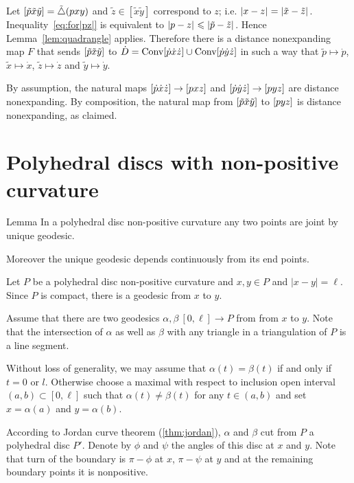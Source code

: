 Let $\trig{\tilde  p}{\tilde  x}{\tilde  y}=\modtrig0 (p x y)$ 
and $\tilde  z\in[\tilde  x\tilde  y]$ correspond to $z$; i.e. $\dist{x}{z}{}=\dist{\tilde  x}{\tilde  z}{}$.
Inequality~\ref{eq:for|pz|} is equivalent to $\dist{ p}{ z}{}\le \dist{\tilde  p}{\tilde  z}{}$.
Hence  Lemma~\ref{lem:quadrangle} applies.  Therefore 
there is a distance nonexpanding map $F$ that  sends 
$\trig{\tilde  p}{\tilde  x}{\tilde  y}$ to $\dot D=\Conv\trig {\dot p}{\dot x}{\dot z}\cup \Conv\trig {\dot p} {\dot y} {\dot z}$ 
in such a way that 
$\tilde p\mapsto \dot p$,
$\tilde x\mapsto \dot x$,
$\tilde z\mapsto \dot z$
and
$\tilde y\mapsto \dot y$.

By assumption, the natural maps $\trig {\dot p} {\dot x} {\dot z}\to\trig p x z$ and $\trig {\dot p} {\dot y} {\dot z}\to\trig p y z$ are distance nonexpanding.  
By composition,  the natural map from $\trig{\tilde  p}{\tilde  x}{\tilde  y}$ to $\trig p y z$ is distance nonexpanding, as claimed.
\qeds

\section{Polyhedral discs with non-positive curvature}

\begin{thm}{Lemma}
In a polyhedral disc non-positive curvature
any two points are joint by unique geodesic.

Moreover the unique geodesic depends continuously from its end points.
\end{thm}

Let $P$ be a polyhedral disc non-positive curvature and $x,y\in P$ and $|x-y|=\ell$.
Since $P$ is compact,
there is a geodesic from $x$ to $y$.

Assume that there are two geodesics $\alpha,\beta\:[0,\ell]\to P$ from  from $x$ to $y$.
Note that the intersection of $\alpha$ as well as $\beta$
with any triangle in a triangulation of $P$ is a line segment.


Without loss of generality, we may assume that 
$\alpha(t)= \beta(t)$ if and only if $t=0$ or $l$.
Otherwise choose a maximal with respect to inclusion open interval 
$(a,b)\subset [0,\ell]$ such that $\alpha(t)\ne \beta(t)$ for any $t\in (a,b)$ and set $x=\alpha(a)$ and $y=\alpha(b)$.

According to Jordan curve theorem (\ref{thm:jordan}), 
$\alpha$ and $\beta$ cut from $P$ a polyhedral disc $P'$.
Denote by $\phi$ and $\psi$ the angles of this disc at $x$ and $y$.
Note that turn of the boundary is $\pi-\phi$ at $x$,
$\pi-\psi$ at $y$ and at the remaining boundary points it is nonpositive. 

